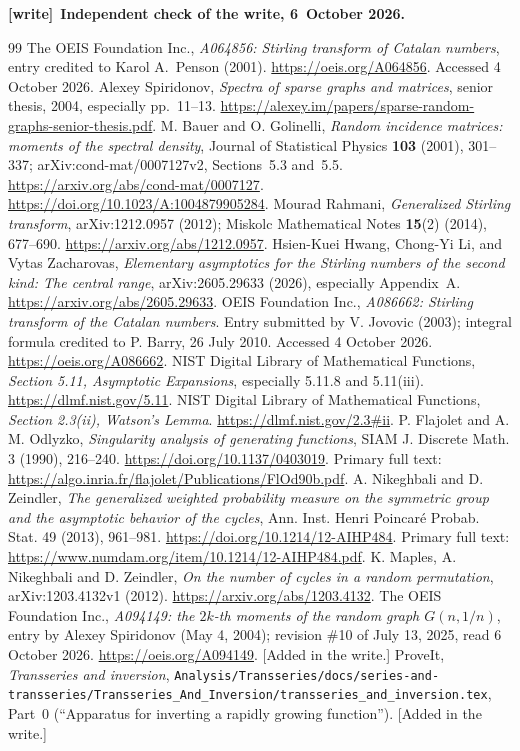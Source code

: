 \documentclass[11pt,letterpaper]{article}
\numberwithin{equation}{section}
\theoremstyle{remark}\newtheorem{remark}[theorem]{Remark}
\newcommand{\file}[1]{\nolinkurl{#1}}
\newenvironment{writenote}[1][]{\par\smallskip\begingroup\small
 \noindent\textbf{[write]}\if\relax\detokenize{#1}\relax\else~\textbf{#1.}\fi\ }%
 {\par\endgroup\smallskip}
\begin{document}
\begin{writenote}[Independent check of the write, 6~October 2026]
\end{writenote}

\begin{thebibliography}{99}
The OEIS Foundation Inc., \emph{A064856: Stirling transform of Catalan numbers}, entry credited to Karol A.~Penson (2001). \url{https://oeis.org/A064856}. Accessed 4 October 2026.
Alexey Spiridonov, \emph{Spectra of sparse graphs and matrices}, senior thesis, 2004, especially pp.~11--13. \url{https://alexey.im/papers/sparse-random-graphs-senior-thesis.pdf}.
M. Bauer and O. Golinelli, \emph{Random incidence matrices: moments of the spectral density}, Journal of Statistical Physics \textbf{103} (2001), 301--337; arXiv:cond-mat/0007127v2, Sections~5.3 and~5.5. \url{https://arxiv.org/abs/cond-mat/0007127}. \url{https://doi.org/10.1023/A:1004879905284}.
Mourad Rahmani, \emph{Generalized Stirling transform}, arXiv:1212.0957 (2012); Miskolc Mathematical Notes \textbf{15}(2) (2014), 677--690. \url{https://arxiv.org/abs/1212.0957}.
Hsien-Kuei Hwang, Chong-Yi Li, and Vytas Zacharovas, \emph{Elementary asymptotics for the Stirling numbers of the second kind: The central range}, arXiv:2605.29633 (2026), especially Appendix~A. \url{https://arxiv.org/abs/2605.29633}.
 OEIS Foundation Inc., \emph{A086662: Stirling transform of the Catalan numbers}. Entry submitted by V. Jovovic (2003); integral formula credited to P. Barry, 26 July 2010. Accessed 4 October 2026. \url{https://oeis.org/A086662}.
 NIST Digital Library of Mathematical Functions, \emph{Section 5.11, Asymptotic Expansions}, especially 5.11.8 and 5.11(iii). \url{https://dlmf.nist.gov/5.11}.
 NIST Digital Library of Mathematical Functions, \emph{Section 2.3(ii), Watson's Lemma}. \url{https://dlmf.nist.gov/2.3#ii}.
 P. Flajolet and A. M. Odlyzko, \emph{Singularity analysis of generating functions}, SIAM J. Discrete Math. 3 (1990), 216--240. \url{https://doi.org/10.1137/0403019}. Primary full text: \url{https://algo.inria.fr/flajolet/Publications/FlOd90b.pdf}.
 A. Nikeghbali and D. Zeindler, \emph{The generalized weighted probability measure on the symmetric group and the asymptotic behavior of the cycles}, Ann. Inst. Henri Poincar\'e Probab. Stat. 49 (2013), 961--981. \url{https://doi.org/10.1214/12-AIHP484}. Primary full text: \url{https://www.numdam.org/item/10.1214/12-AIHP484.pdf}.
 K. Maples, A. Nikeghbali and D. Zeindler, \emph{On the number of cycles in a random permutation}, arXiv:1203.4132v1 (2012). \url{https://arxiv.org/abs/1203.4132}.
The OEIS Foundation Inc., \emph{A094149: the $2k$-th moments of the random graph $G(n,1/n)$}, entry by Alexey Spiridonov (May 4, 2004); revision \#10 of July 13, 2025, read 6 October 2026. \url{https://oeis.org/A094149}. [Added in the write.]
ProveIt, \emph{Transseries and inversion}, \file{Analysis/Transseries/docs/series-and-transseries/Transseries_And_Inversion/transseries_and_inversion.tex}, Part~0 (``Apparatus for inverting a rapidly growing function''). [Added in the write.]
\end{thebibliography}
\end{document}
